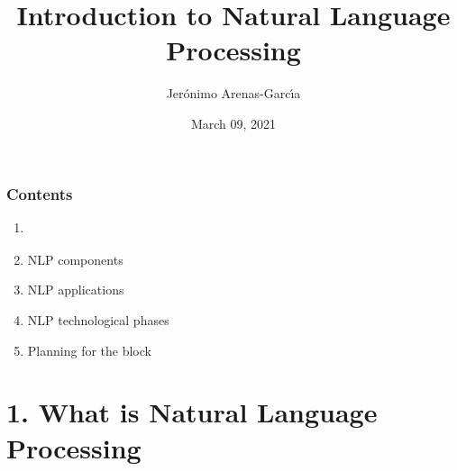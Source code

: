 \documentclass{beamer}
\title[IntroNLP]{Introduction to Natural Language Processing} %
\author{Jer\'onimo Arenas-Garc\'{\i}a} %
\institute[UC3M] %
{
Universidad Carlos III de Madrid \\ %
\medskip
\textit{jeronimo.arenas@uc3m.es} %
}
\date{March 09, 2021}
\begin{document}
\begin{frame}
\titlepage %
\end{frame}


\begin{frame}

    \frametitle{Contents}

	\large

    \begin{enumerate}
  
    	\item {\bf \color{blue}{What is Natural Language Processing?}}
    	\item NLP components
    	\item NLP applications
    	\item NLP technological phases
    	\item Planning for the block
    
    \end{enumerate}

\end{frame}

\section{1. What is Natural Language Processing}
\end{document}
